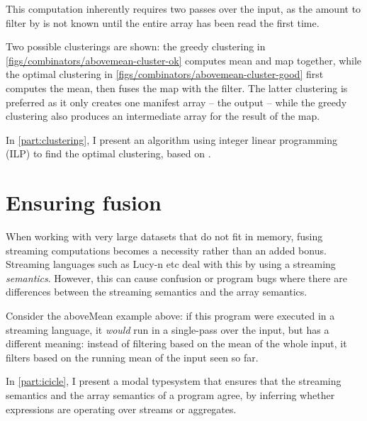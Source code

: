
This computation inherently requires two passes over the input, as the amount to filter by is not known until the entire array has been read the first time.


Two possible clusterings are shown:
the greedy clustering in \autoref{figs/combinators/abovemean-cluster-ok} computes mean and map together, while the optimal clustering in \autoref{figs/combinators/abovemean-cluster-good} first computes the mean, then fuses the map with the filter.
The latter clustering is preferred as it only creates one manifest array -- the output -- while the greedy clustering also produces an intermediate array for the result of the map.

In \autoref{part:clustering}, I present an algorithm using integer linear programming (ILP) to find the optimal clustering, based on \citet{megiddo1998optimal}.

\section{Ensuring fusion}

When working with very large datasets that do not fit in memory, fusing streaming computations becomes a necessity rather than an added bonus.
Streaming languages such as Lucy-n etc deal with this by using a streaming \emph{semantics}.
However, this can cause confusion or program bugs where there are differences between the streaming semantics and the array semantics.

Consider the aboveMean example above: if this program were executed in a streaming language, it \emph{would} run in a single-pass over the input, but has a different meaning: instead of filtering based on the mean of the whole input, it filters based on the running mean of the input seen so far.

In \autoref{part:icicle}, I present a modal typesystem that ensures that the streaming semantics and the array semantics of a program agree, by inferring whether expressions are operating over streams or aggregates.

